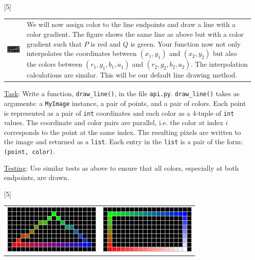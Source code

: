 \documentclass[addpoints]{exam}
\begin{document}
\begin{questions}
[5]

  \noindent
  \begin{tabularx}{\linewidth}{lX}
    \includegraphics[align=t]{dda-color} &
                                           We will now assign color to the line endpoints and draw a line with a color gradient. The figure shows the same line as above but with a color gradient such that $P$ is red and $Q$ is green. Your function now not only interpolates the coordinates between $(x_1,y_1)$ and  $(x_2,y_2)$ but also the colors between $(r_1, g_1, b_1, a_1)$ and  $(r_2, g_2, b_2, a_2)$. The interpolation calculations are similar. This will be our default line drawing method.
  \end{tabularx}
  \underline{Task}: Write a function, \texttt{draw\_line()}, in the file \texttt{api.py}. \texttt{draw\_line()} takes as arguments: a \texttt{MyImage} instance, a pair of points, and a pair of colors. Each point is represented as a pair of \texttt{int} coordinates and each color as a 4-tuple of \texttt{int} values. The coordinate and color pairs are parallel, i.e. the color at index $i$ corresponds to the point at the same index. The resulting pixels are written to the image and returned as a \texttt{list}. Each entry in the \texttt{list} is a pair of the form: \texttt{(point, color)}.

  \underline{Testing}: Use similar tests as above to ensure that all colors, especially at both endpoints, are drawn.

[5]

  \begin{center}
    \begin{tabular}{cc}
      \includegraphics[align=t]{tri} & \includegraphics[align=t]{quad}
    \end{tabular}
  \end{center}
  

\end{questions}
\end{document}
